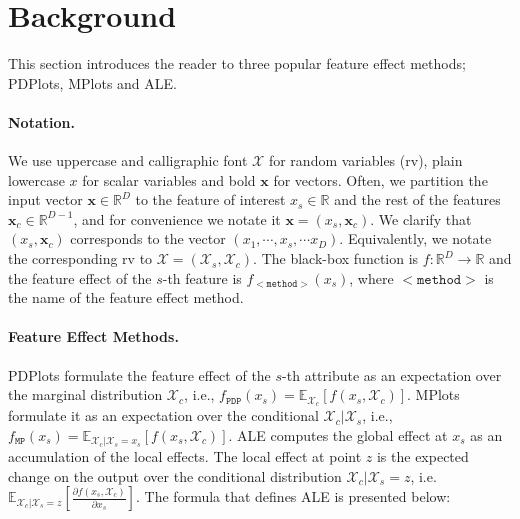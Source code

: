 \documentclass[wcp]{jmlr}
\newcommand{\xc}{\mathbf{x}_c}
\newcommand{\Xcb}{\mathcal{X}_c}
\newcommand{\xb}{\mathbf{x}}
\newcommand{\R}{\mathbb{R}}
\newcommand{\E}{\mathbb{E}}
\begin{document}
\section{Background}
\label{sec:3-feature-effect}

This section introduces the reader to three popular feature effect methods; PDPlots, MPlots and ALE.

\paragraph*{Notation.} We use uppercase and calligraphic font \( \mathcal{X}\) for random variables (rv), plain lowercase \( x \) for scalar variables and bold \( \xb \) for vectors. Often, we partition the input vector \(\xb \in \R^D\) to the feature of interest \(x_s \in \R \) and the rest of the features \(\xc \in \R^{D-1}\), and for convenience we notate it \(\xb = (x_s, \xc)\). We clarify that \((x_s, \xc)\) corresponds to the vector \((x_1, \cdots, x_s, \cdots x_D)\). Equivalently, we notate the corresponding rv to \(\mathcal{X} = (\mathcal{X}_s, \mathcal{X}_c)\). The black-box function is \( f: \R^D \rightarrow \R \) and the feature effect of the \(s\)-th feature is \(f_{\mathtt{<method>}}(x_s)\), where \(\mathtt{<method>}\) is the name of the feature effect method.%

\paragraph{Feature Effect Methods.} PDPlots formulate the feature effect of the \(s\)-th attribute as an expectation over the marginal distribution \(\mathcal{X}_c\), i.e., \(f_{\mathtt{PDP}}(x_s) = \mathbb{\E}_{\mathcal{X}_c}[f(x_s,\mathcal{X}_c)]\). MPlots formulate it as an expectation over the conditional \(\mathcal{X}_c|\mathcal{X}_s\), i.e., \(f_{\mathtt{MP}}(x_s) = \E_{\mathcal{X}_c|\mathcal{X}_s = x_s}[f(x_s, \mathcal{X}_c)]\). ALE computes the global effect at \(x_s\) as an accumulation of the local effects. The local effect at point \(z\) is the expected change on the output over the conditional distribution \(\Xcb|\mathcal{X}_s=z\), i.e.  \( \E_{\Xcb|\mathcal{X}_s=z} \left [ \frac{\partial f(x_s, \mathcal{X}_c)}{\partial x_s} \right] \). The formula that defines ALE is presented below:
\end{document}
